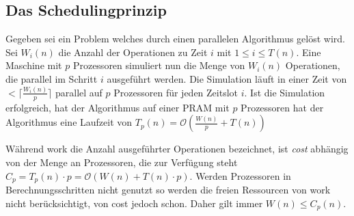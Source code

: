 \subsection{Das Schedulingprinzip}
Gegeben sei ein Problem welches durch einen parallelen Algorithmus gelöst wird.
Sei $W_i(n)$ die Anzahl der Operationen zu Zeit $i$ mit $1 \leq i \leq T(n)$.
Eine Maschine mit $p$ Prozessoren simuliert nun die Menge von $W_i(n)$
Operationen, die parallel im Schritt $i$ ausgeführt werden.
Die Simulation läuft in einer Zeit von $< \lceil \frac{W_i(n)}{p} \rceil$
parallel auf $p$ Prozessoren für jeden Zeitslot $i$.
Ist die Simulation erfolgreich, hat der Algorithmus auf einer PRAM mit $p$
Prozessoren hat der Algorithmus eine Laufzeit von
$T_p(n) = \mathcal{O} \left( \frac{W(n)}{p} + T(n) \right)$
\cite[S.28]{jaja}

Während work die Anzahl ausgeführter Operationen bezeichnet, ist \emph{cost}
abhängig von der Menge an Prozessoren, die zur Verfügung steht
$C_p = T_p(n) \cdot p = \mathcal{O} (W(n) + T(n) \cdot p)$.
Werden Prozessoren in Berechnungsschritten nicht genutzt so werden die freien
Ressourcen von work nicht berücksichtigt, von cost jedoch schon.
Daher gilt immer $W(n) \leq C_p(n)$.
\cite[S.31]{jaja}
